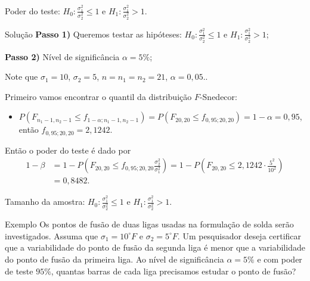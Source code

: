 \documentclass[9pt]{beamer}
\begin{document}
\begin{frame}{Poder do teste: $H_0:\frac{\sigma_1^2}{\sigma_2^2} \leq 1$ e $H_1:\frac{\sigma_1^2}{\sigma_2^2} > 1$.}

\begin{block}{Solução}
	\textbf{Passo 1)} Queremos testar as hipóteses: $H_0: \frac{\sigma_1^2}{\sigma_2^2} \leq 1$ e $H_1: \frac{\sigma_1^2}{\sigma_2^2} > 1$;
	
	\textbf{Passo 2)} Nível de significância $\alpha=5\%$;
	
	Note que $\sigma_1=10$, $\sigma_2=5$, $n=n_1=n_2=21$, $\alpha=0,05$..
	
	Primeiro vamos encontrar o quantil da distribuição $F$-Snedecor:
	\begin{itemize}
		\item $P( F_{n_1-1, n_2-1} \leq f_{1-\alpha; n_1-1, n_2-1} ) = P\left( F_{20, 20} \leq f_{0,95; 20, 20} \right) = 1-\alpha = 0,95$, então $f_{0,95; 20, 20} = 2,1242$.
	\end{itemize}

	Então o poder do teste é dado por
	\begin{align*}
		1-\beta &= 1- P \left( F_{20, 20} \leq f_{0,95; 20, 20} \frac{\sigma_2^2}{\sigma_1^2} \right) = 1- P \left( F_{20, 20} \leq 2,1242 \cdot  \frac{5^2}{10^2} \right)\\
		&= 0,8482.
	\end{align*}
\end{block}
\end{frame}

\begin{frame}{Tamanho da amostra: $H_0:\frac{\sigma_1^2}{\sigma_2^2} \leq 1$ e $H_1:\frac{\sigma_1^2}{\sigma_2^2} > 1$.}

\large
\begin{block}{Exemplo}
	Os pontos de fusão de duas ligas usadas na formulação de solda serão investigados. Assuma que $\sigma_1=10^\circ F$ e $\sigma_2=5^\circ F$. Um pesquisador deseja certificar que a variabilidade do ponto de fusão da segunda liga é menor que a variabilidade do ponto de fusão da primeira liga. Ao nível de significância $\alpha=5\%$ e com poder de teste $95\%$, quantas barras de cada liga precisamos estudar o ponto de fusão?
\end{block}

\normalsize
\end{frame}
\end{document}
